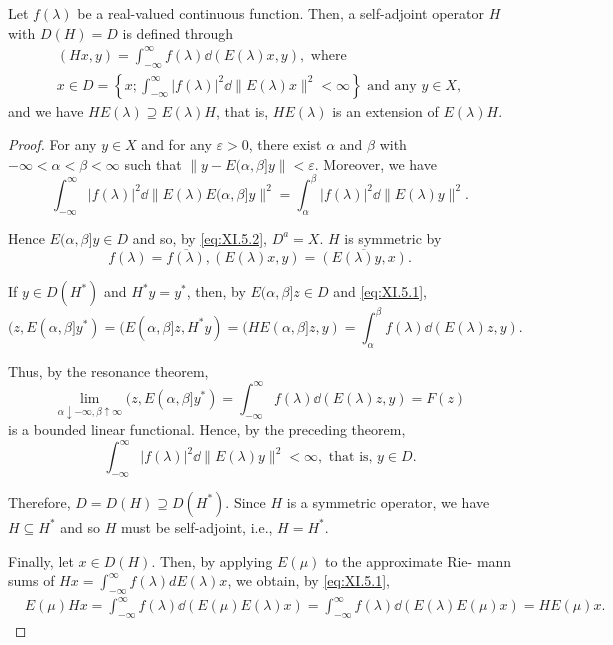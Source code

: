 \begin{theorem}\label{thm:XI.5.Theorem.2} Let $f(\lambda)$ be a real-valued continuous function. Then, a self-adjoint operator $H$ with $D(H) = D$ is defined through 
\begin{equation}\label{eq:XI.5.9}
\begin{gathered}
(H x, y) = \int_{- \infty} ^{\infty} f (\lambda) \dd (E (\lambda) x, y), \text{ where }
\\
x \in D = \left\{x; \int_{- \infty} ^{\infty} | f (\lambda) | ^{2} \dd \| E (\lambda) x \| ^{2} < \infty \right\} \text{ and any } y \in X,
\end{gathered}
\end{equation}
and we have $HE(\lambda) \supseteq E(\lambda)H$, that is, $HE(\lambda)$ is an extension of $E(\lambda)H$. 
\end{theorem}

\begin{proof}
 For any $y \in X$ and for any $\varepsilon > 0$, there exist $\alpha$ and $\beta$ with $-\infty < \alpha < \beta < \infty$ such that $\|y - E(\alpha, \beta] y\| < \varepsilon$. Moreover, we have 
\[
\int_{- \infty} ^{\infty} | f (\lambda) | ^{2} \dd \| E (\lambda) E (\alpha , \beta ] y \| ^{2} = \int_{\alpha} ^{\beta} | f (\lambda) | ^{2} \dd \| E (\lambda) y \| ^{2}. \]

Hence $E(\alpha, \beta] y \in D$ and so, by \eqref{eq:XI.5.2}, $D^a = X$. $H$ is symmetric by 
\[
f (\lambda) = \overline {{f (\lambda)}}, (E (\lambda) x, y) = \overline {{(E (\lambda) y , x)}}.
\]

If $y \in D(H^{*})$ and $H^{*}y = y^{*}$, then, by $E(\alpha, \beta]z \in D$ and \eqref{eq:XI.5.1}, 
\[
(z, E (\alpha , \beta ] y ^{*}) = (E (\alpha , \beta ] z, H ^{*} y) = (H E (\alpha , \beta ] z, y) = \int_{\alpha} ^{\beta} f (\lambda) \dd (E (\lambda) z, y).
\]

Thus, by the resonance theorem, 
\[
\lim\limits _{\alpha \downarrow - \infty , \beta \uparrow \infty} (z, E (\alpha , \beta ] y ^{*}) = \int_{- \infty} ^{\infty} f (\lambda) \dd (E (\lambda) z, y) = F (z)
\]
is a bounded linear functional. Hence, by the preceding theorem, 
\[
\int_{- \infty} ^{\infty} | f (\lambda) | ^{2} \dd \| E (\lambda) y \| ^{2} < \infty , \text{ that is, } y \in D.
\]

Therefore, $D = D(H) \supseteq D(H^*)$. Since $H$ is a symmetric operator, we have $H \subseteq H^*$ and so $H$ must be self-adjoint, i.e., $H = H^*$. 


Finally, let $x \in D(H)$. Then, by applying $E(\mu)$ to the approximate Rie-
mann sums of $Hx = \int_{-\infty}^{\infty} f(\lambda) dE(\lambda)x$, we obtain, by \eqref{eq:XI.5.1}, 
\[
\begin{aligned}
&E (\mu) H x  = \int_{- \infty} ^{\infty} f (\lambda) \dd (E (\mu) E (\lambda) x) = \int_{- \infty} ^{\infty} f (\lambda) \dd (E (\lambda) E (\mu) x) = H E (\mu) x.
\end{aligned}
\]
\end{proof}

